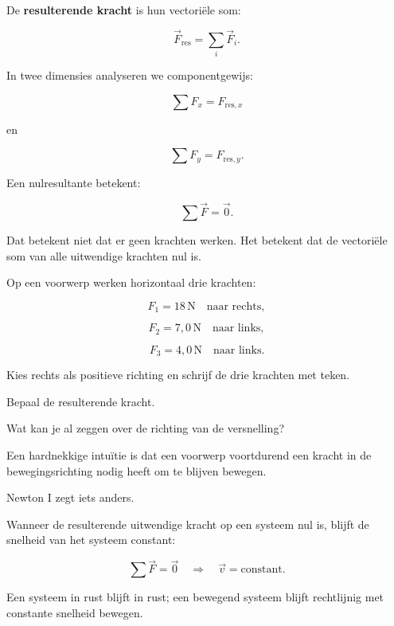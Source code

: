 \documentclass{ximera}
\begin{document}
De \textbf{resulterende kracht} is hun vectoriële som:

\[
\boxed{
\vec F_{\mathrm{res}}
=
\sum_i\vec F_i.
}
\]

In twee dimensies analyseren we componentgewijs:

\[
\boxed{
\sum F_x=F_{\mathrm{res},x}
}
\]

en

\[
\boxed{
\sum F_y=F_{\mathrm{res},y}.
}
\]

Een nulresultante betekent:

\[
\sum\vec F=\vec 0.
\]

Dat betekent niet dat er geen krachten werken. Het betekent dat de
vectoriële som van alle uitwendige krachten nul is.


\begin{oefening}{\oefB\ESS}

Op een voorwerp werken horizontaal drie krachten:

\[
F_1=18\,\mathrm N\quad\text{naar rechts},
\]

\[
F_2=7,0\,\mathrm N\quad\text{naar links},
\]

\[
F_3=4,0\,\mathrm N\quad\text{naar links}.
\]

\begin{question}
Kies rechts als positieve richting en schrijf de drie krachten met teken.
\end{question}

\begin{question}
Bepaal de resulterende kracht.
\end{question}

\begin{question}
Wat kan je al zeggen over de richting van de versnelling?
\end{question}

\end{oefening}




Een hardnekkige intuïtie is dat een voorwerp voortdurend een kracht in
de bewegingsrichting nodig heeft om te blijven bewegen.

Newton I zegt iets anders.

\begin{eigenschap}
Wanneer de resulterende uitwendige kracht op een systeem nul is, blijft
de snelheid van het systeem constant:

\[
\boxed{
\sum\vec F=\vec 0
\quad\Longrightarrow\quad
\vec v=\text{constant}.
}
\]

Een systeem in rust blijft in rust; een bewegend systeem blijft
rechtlijnig met constante snelheid bewegen.
\end{eigenschap}
\end{document}
